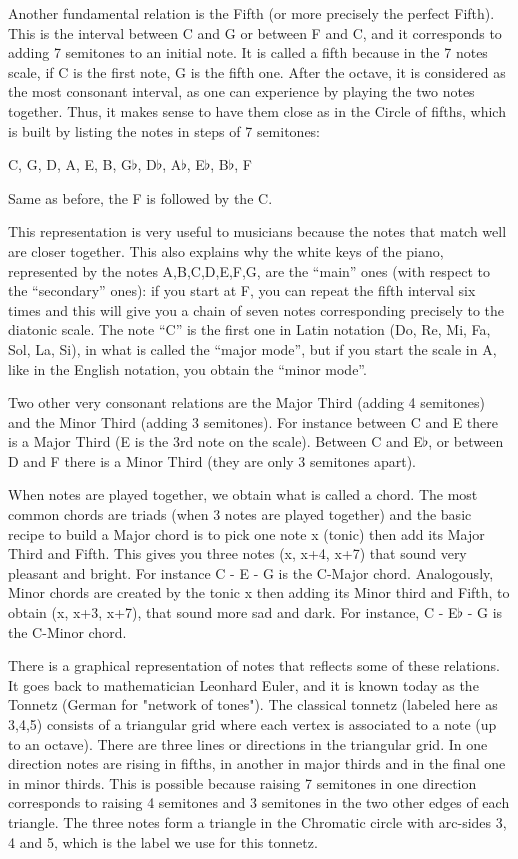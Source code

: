 Another fundamental relation is the Fifth (or more precisely the perfect Fifth). This is the interval between C and G or between F and C, and it corresponds to adding 7 semitones to an initial note. It is called a fifth because in the 7 notes scale, if C is the first note, G is the fifth one. After the octave, it is considered as the most consonant interval, as one can experience by playing the two notes together. Thus, it makes sense to have them close as in the Circle of fifths, which is built by listing the notes in steps of 7 semitones:
\begin{center}
C, G, D, A, E, B, G$\flat$, D$\flat$, A$\flat$, E$\flat$, B$\flat$, F
\end{center}
Same as before, the F is followed by the C.

This representation is very useful to musicians because the notes that match well are closer together. This also explains why the white keys of the piano, represented by the  notes A,B,C,D,E,F,G, are the ``main'' ones (with respect to the ``secondary'' ones): if you start at F, you can repeat the fifth interval six times and this will give you a chain of seven notes corresponding precisely to the diatonic scale. The note ``C'' is the first one in Latin notation (Do, Re, Mi, Fa, Sol, La, Si), in what is called the ``major mode'', but if you start the scale in A, like in the English notation, you obtain the ``minor mode''.

Two other very consonant relations are the Major Third (adding 4 semitones) and the Minor Third (adding 3 semitones). For instance between C and E there is a Major Third (E is the 3rd note on the scale). Between C and E$\flat$, or between D and F there is a Minor Third (they are only 3 semitones apart).

When notes are played together, we obtain what is called a chord. The most common chords are triads (when 3 notes are played together) and the basic recipe to build a Major chord is to pick one note x (tonic) then add its Major Third and Fifth. This gives you three notes (x, x+4, x+7) that sound very pleasant and bright. For instance C - E - G is the C-Major chord. Analogously, Minor chords are created by the tonic x then adding its Minor third and Fifth, to obtain (x, x+3, x+7), that sound more sad and dark. For instance, C - E$\flat$ - G is the C-Minor chord.

There is a graphical representation of notes that reflects some of these relations. It goes back to mathematician Leonhard Euler, and it is known today as the Tonnetz (German for "network of tones"). The classical tonnetz (labeled here as 3,4,5) consists of a triangular grid where each vertex is associated to a note (up to an octave). There are three lines or directions in the triangular grid. In one direction notes are rising in fifths, in another in major thirds and in the final one in minor thirds. This is possible because raising 7 semitones in one direction corresponds to raising 4 semitones and 3 semitones in the two other edges of each triangle. The three notes form a triangle in the Chromatic circle with arc-sides 3, 4 and 5, which is the label we use for this tonnetz.


